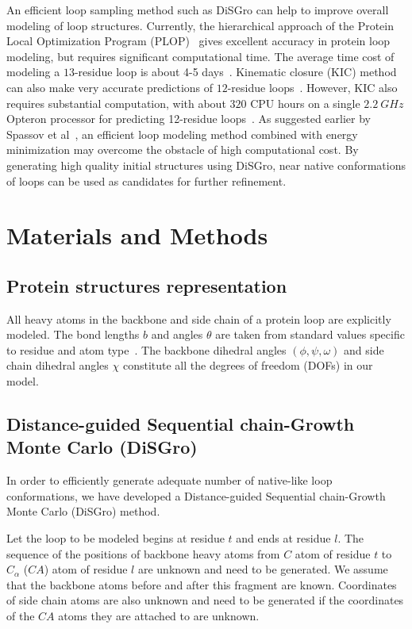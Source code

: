 An efficient loop sampling method such as {\sc DiSGro} can help to
improve overall modeling of loop structures. Currently, the
hierarchical approach of the Protein Local Optimization Program
(PLOP)~\cite{jacobson2004,zhu2006,zhao2011} gives excellent accuracy
in protein loop modeling, but requires significant computational
time. The average time cost of modeling a $13$-residue loop is about
4-5 days~\cite{zhao2011}. Kinematic closure (KIC) method can also
make very accurate predictions of $12$-residue
loops~\cite{mandell2009}. However, KIC also requires substantial
computation, with about $320$ CPU hours on a single $2.2\:GHz$
Opteron processor for predicting 12-residue
loops~\cite{mandell2009}. As suggested earlier by Spassov et
al~\cite{spassov2008}, an efficient loop modeling method combined
with energy minimization may overcome the obstacle of high
computational cost. By generating high quality initial structures
using {\sc DiSGro}, near native conformations of loops can be used
as candidates for further refinement.

\section*{Materials and Methods}

\subsection*{Protein structures representation}
All heavy atoms in the backbone and side chain of a protein loop are
explicitly modeled. The bond lengths $b$ and angles $\theta$ are
taken from standard values specific to residue and atom
type~\cite{Engh1991}. The backbone dihedral angles
$(\phi,\psi,\omega)$ and side chain dihedral angles $\chi$
constitute all the degrees of freedom (DOFs) in our model.

\subsection*{Distance-guided Sequential chain-Growth Monte Carlo ({\sc DiSGro})}
In order to efficiently generate adequate number of native-like loop
conformations, we have developed a Distance-guided Sequential
chain-Growth Monte Carlo ({\sc DiSGro}) method.

Let the loop to be modeled begins at residue $t$ and ends at residue
$l$. The sequence of the positions of backbone heavy atoms from $C$
atom of residue $t$ to $C_\alpha$ ($CA$) atom of residue $l$ are
unknown and need to be generated. We assume that the backbone atoms
before and after this fragment are known. Coordinates of side chain
atoms are also unknown and need to be generated if the coordinates
of the $CA$ atoms they are attached to are unknown.

